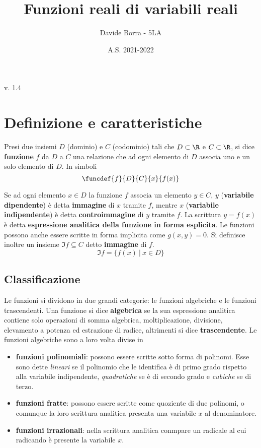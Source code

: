 \documentclass{article}     %
\title{Funzioni reali di variabili reali}
\author{Davide Borra - 5LA}
\date{A.S. 2021-2022}
\begin{document}
    \begin{titlepage}
    \maketitle
    \tableofcontents
    \creativecommons
    \vspace{\fill}
    \hspace{\fill} v. 1.4   %
    \end{titlepage}
    
    \chead{}

    \section{Definizione e caratteristiche}
        \begin{boxdef}
            Presi due insiemi $D$ (dominio) e $C$ (codominio) tali che $D \subset \R$ e $C \subset \R$, si dice \textbf{funzione} $f$ da $D$ a $C$ una relazione che ad ogni elemento di $D$ associa uno e un solo elemento di $D$. In simboli \[\funcdef{f}{D}{C}{x}{f(x)} \]
        \end{boxdef}
        Se ad ogni elemento $x \in D$ la funzione $f$ associa un elemento $y\in C$, $y$ (\textbf{variabile dipendente}) è detta \textbf{immagine} di $x$ tramite $f$, mentre $x$ (\textbf{variabile indipendente}) è detta \textbf{controimmagine} di $y$ tramite $f$. La scrittura $y=f(x)$ è detta \textbf{espressione analitica della funzione in forma esplicita}. Le funzioni possono anche essere scritte in forma implicita come $g(x,y)=0$. Si definisce inoltre un insieme $\Im f\subseteq C$ detto \textbf{immagine} di $f$.
        \[\Im f=\{f(x)\:|\: x \in D\}\] 
    
    \subsection{Classificazione}
        Le funzioni si dividono in due grandi categorie: le funzioni algebriche e le funzioni trascendenti. Una funzione si dice \textbf{algebrica} se la sua espressione analitica contiene solo operazioni di somma algebrica, moltiplicazione, divisione, elevamento a potenza ed estrazione di radice, altrimenti si dice \textbf{trascendente}. Le funzioni algebriche sono a loro volta divise in \begin{itemize}
            \item \textbf{funzioni polinomiali}: possono essere scritte sotto forma di polinomi. Esse sono dette \textit{lineari} se il polinomio che le identifica è di primo grado rispetto alla variabile indipendente, \textit{quadratiche} se è di secondo grado e \textit{cubiche} se di terzo.
            \item \textbf{funzioni fratte}: possono essere scritte come quoziente di due polinomi, o comunque la loro scrittura analitica presenta una variabile $x$ al denominatore.
            \item \textbf{funzioni irrazionali}: nella scrittura analitica conmpare un radicale al cui radicando è presente la variabile $x$.
        \end{itemize}
\end{document}
